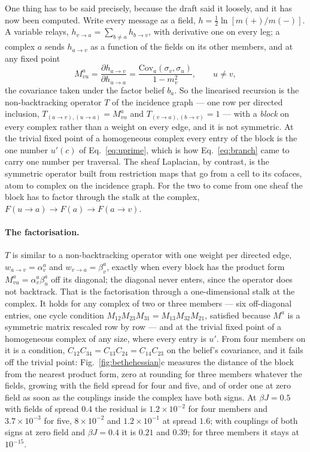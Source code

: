 One thing has to be said precisely, because the draft said it loosely,
and it has now been computed. Write every message as a field,
$h=\tfrac12\ln[m(+)/m(-)]$. A variable relays,
$h_{v\to a}=\sum_{b\ne a}h_{b\to v}$, with derivative one on every leg; a
complex $a$ sends $h_{a\to v}$ as a function of the fields on its other
members, and at any fixed point
\begin{equation}
  M^{a}_{vu}=\frac{\partial h_{a\to v}}{\partial h_{u\to a}}
  =\frac{\mathrm{Cov}_{a}(\sigma_{v},\sigma_{u})}{1-m_{v}^{2}},
  \qquad u\ne v,
  \label{eq:mb-block}
\end{equation}
the covariance taken under the factor belief $b_{a}$. So the linearised
recursion is the non-backtracking operator $T$ of the incidence graph ---
one row per directed inclusion, $T_{(a\to v),(u\to a)}=M^{a}_{vu}$ and
$T_{(v\to a),(b\to v)}=1$ --- with a \emph{block} on every complex rather
than a weight on every edge, and it is not symmetric. At the trivial fixed
point of a homogeneous complex every entry of the block is the one number
$u'(c)$ of Eq.~\eqref{eq:uprime}, which is how Eq.~\eqref{eq:branch} came
to carry one number per traversal. The sheaf Laplacian, by contrast, is
the symmetric operator built from restriction maps that go from a cell to
its cofaces, atom to complex on the incidence graph. For the two to come
from one sheaf the block has to factor through the stalk at the complex,
$F(u\to a)\to F(a)\to F(a\to v)$.

\paragraph{The factorisation.} $T$ is similar to a non-backtracking
operator with one weight per directed edge, $w_{a\to v}=\alpha^{a}_{v}$
and $w_{v\to a}=\beta^{a}_{v}$, exactly when every block has the product
form $M^{a}_{vu}=\alpha^{a}_{v}\beta^{a}_{u}$ off its diagonal; the
diagonal never enters, since the operator does not backtrack. That is the
factorisation through a one-dimensional stalk at the complex. It holds for
any complex of two or three members --- six off-diagonal entries, one
cycle condition $M_{12}M_{23}M_{31}=M_{13}M_{32}M_{21}$, satisfied because
$M^{a}$ is a symmetric matrix rescaled row by row --- and at the trivial
fixed point of a homogeneous complex of any size, where every entry is
$u'$. From four members on it is a condition,
$C_{12}C_{34}=C_{13}C_{24}=C_{14}C_{23}$ on the belief's covariance, and
it fails off the trivial point: Fig.~\ref{fig:bethehessian}c measures the
distance of the block from the nearest product form, zero at rounding for
three members whatever the fields, growing with the field spread for four
and five, and of order one at zero field as soon as the couplings inside
the complex have both signs. At $\beta J=0.5$
with fields of spread $0.4$ the residual is $1.2\times10^{-2}$ for four
members and $3.7\times10^{-3}$ for five, $8\times10^{-2}$ and
$1.2\times10^{-1}$ at spread $1.6$; with couplings of both signs at zero
field and $\beta J=0.4$ it is $0.21$ and $0.39$; for three members it
stays at $10^{-15}$.


